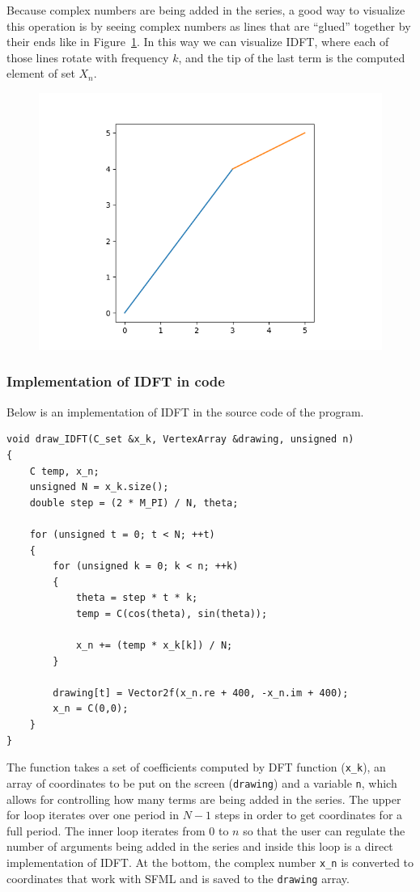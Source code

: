 \documentclass[titlepage]{article}
\begin{document}
    Because complex numbers are being added in the series, a good way to visualize
    this operation is by seeing complex numbers as lines that are ``glued'' together
    by their ends like in Figure~\ref{fig:complex_sum}. In this way we can visualize
    IDFT, where each of those lines rotate with frequency $k$, and the tip of the
    last term is the computed element of set $X_n$.
    \begin{figure}[H]
        \caption{}
        \centering
        \includegraphics[width=0.4\linewidth]{complex_sum}
        \label{fig:complex_sum}
    \end{figure} 

\subsubsection{Implementation of IDFT in code}

    Below is an implementation of IDFT in the source code of the program.
    \begin{verbatim}
void draw_IDFT(C_set &x_k, VertexArray &drawing, unsigned n)
{
    C temp, x_n;
    unsigned N = x_k.size();
    double step = (2 * M_PI) / N, theta;

    for (unsigned t = 0; t < N; ++t)
    {
        for (unsigned k = 0; k < n; ++k)
        {
            theta = step * t * k;     
            temp = C(cos(theta), sin(theta));

            x_n += (temp * x_k[k]) / N;
        }

        drawing[t] = Vector2f(x_n.re + 400, -x_n.im + 400);
        x_n = C(0,0);
    }
}
    \end{verbatim}

    The function takes a set of coefficients computed by DFT function (\texttt{x\_k}),
    an array of coordinates to be put on the screen (\texttt{drawing}) and a variable
    \texttt{n}, which allows for controlling how many terms are being added in the 
    series. The upper for loop iterates over one period in $N-1$ steps in order
    to get coordinates for a full period. The inner loop iterates from $0$ to $n$
    so that the user can regulate the number of arguments being added in the series
    and inside this loop is a direct implementation of IDFT. At the bottom, the 
    complex number \texttt{x\_n} is converted to coordinates that work with SFML 
    and is saved to the \texttt{drawing} array. 
\end{document}
